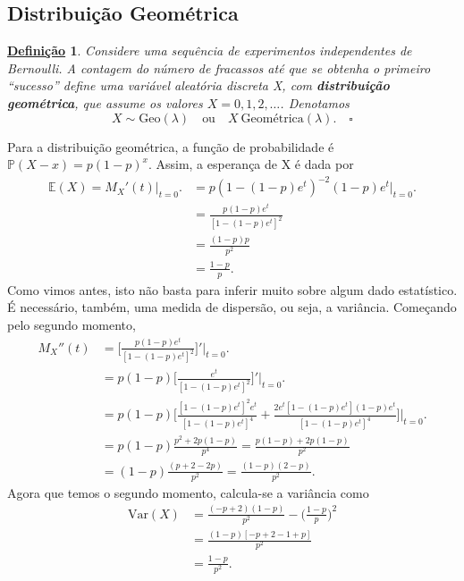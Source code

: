 \documentclass{article}
\newtheorem*{def*}{\underline{Defini\c c\~ao}}
\begin{document}
\subsection{Distribuição Geométrica}
\begin{def*}
  Considere uma sequência de experimentos independentes de Bernoulli. A contagem do número de fracassos até que se obtenha o primeiro
``sucesso'' define uma variável aleatória discreta X, com \textbf{distribuição geométrica}, que assume os valores \(X = 0, 1, 2, \dotsc\). Denotamos 
  \[
    X\sim \mathrm{Geo}(\lambda )\quad \text{ou}\quad X~\text{Geométrica}(\lambda ).\quad\square
  \]
\end{def*}
  Para a distribuição geométrica, a função de probabilidade é \(\mathbb{P}(X-x) = p(1-p)^{x}.\) Assim, a esperança de X é dada por 
 \begin{align*}
  \mathbb{E}(X) = M_{X}'(t)\biggl|_{t=0}^{}\biggr. &= p(1-(1-p)e^{t})^{-2}(1-p)e^{t}\biggl|_{t=0}^{}\biggr.\\
                                                   &= \frac{p(1-p)e^{t}}{[1-(1-p)e^{t}]^{2}}\\
                                                   &=\frac{(1-p)p}{p^{2}}\\
                                                   &=\frac{1-p}{p}.
 \end{align*}
 Como vimos antes, isto não basta para inferir muito sobre algum dado estatístico. É necessário, também, uma medida de dispersão, ou seja, a variância.
 Começando pelo segundo momento, 
 \begin{align*}
 M_{X}''(t) &= \biggl[\frac{p(1-p)e^{t}}{[1-(1-p)e^{t}]^{2}}\biggr]'\biggl|_{t=0}^{}\biggr.\\
            &= p(1-p)\biggl[\frac{e^{t}}{[1-(1-p)e^{t}]^{2}}\biggr]'\biggl|_{t=0}^{}\biggr.\\
            &= p(1-p)\biggl[\frac{[1-(1-p)e^{t}]^{2}e^{t}}{[1-(1-p)e^{t}]^{4}} + \frac{2e^{t}[1-(1-p)e^{t}](1-p)e^{t}}{[1-(1-p)e^{t}]^{4}}\biggr]\biggl|_{t=0}^{}\biggr.\\
            &= p(1-p)\frac{p^{2}+2p(1-p)}{p^{4}} = \frac{p(1-p)+2p(1-p)}{p^{2}}\\
            &= (1-p)\frac{(p+2-2p)}{p^{2}} = \frac{(1-p)(2-p)}{p^{2}}.
 \end{align*}
 Agora que temos o segundo momento, calcula-se a variância como 
\begin{align*}
  \mathrm{Var}(X) &= \frac{(-p+2)(1-p)}{p^{2}} - \biggl(\frac{1-p}{p}\biggr)^{2}\\
                  &= \frac{(1-p)[-p+2-1+p]}{p^{2}}\\
                  &= \frac{1-p}{p^{2}}.
\end{align*}
\end{document}
